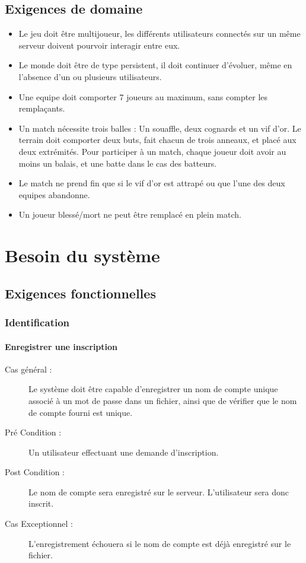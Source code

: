 \documentclass[a4paper]{article}
\begin{document}
\subsection{Exigences de domaine}
\begin{itemize}
    \item Le jeu doit être multijoueur, les différents \glspl{utilisateur} connectés sur un même \gls{serveur} doivent pourvoir interagir entre eux.
    \item Le monde doit être de type persistent, il doit continuer d'évoluer, même en l'absence d'un ou plusieurs \glspl{utilisateur}.
    \item Une \gls{equipe} doit comporter 7 \glspl{joueur} au maximum, sans compter les remplaçants.
    \item Un match nécessite trois balles : Un souaffle, deux cognards et un vif d'or. Le terrain doit comporter deux buts, fait chacun de trois anneaux, et placé aux deux extrémités. Pour participer à un match, chaque \gls{joueur} doit avoir au moins un balais, et une batte dans le cas des batteurs.
    \item Le match ne prend fin que si le vif d'or est attrapé ou que l'une des deux \glspl{equipe} abandonne.
    \item Un \gls{joueur} blessé/mort ne peut être remplacé en plein match.
\end{itemize}


\section{Besoin du système}
\subsection{Exigences fonctionnelles}

\subsubsection{Identification}
\paragraph{Enregistrer une inscription}
\begin{description}
\item[Cas général :] Le système doit être capable d'enregistrer un nom de compte unique associé à un mot de passe dans un fichier, ainsi que de vérifier que le nom de compte fourni est unique.
\item[Pré Condition  :] Un \gls{utilisateur} effectuant une demande d'inscription.
\item[Post Condition :] Le nom de compte sera enregistré sur le \gls{serveur}. L'\gls{utilisateur} sera donc inscrit.
\item[Cas Exceptionnel :] L'enregistrement échouera si le nom de compte est déjà enregistré sur le fichier.
\end{description}
\end{document}
